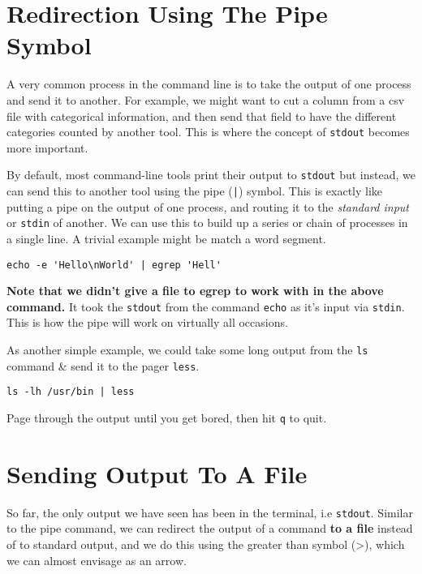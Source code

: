 \section{Redirection Using The Pipe Symbol}
\begin{information}
A very common process in the command line is to take the output of one process and send it to another.
For example, we might want to cut a column from a csv file with categorical information, and then send that field to have the different categories counted by another tool.
This is where the concept of \texttt{stdout} becomes more important. \\
\end{information}

\begin{steps}
By default, most command-line tools print their output to \texttt{stdout} but instead, we can send this to another tool using the pipe (\texttt{|}) symbol.
This is exactly like putting a pipe on the output of one process, and routing it to the \textit{standard input} or \texttt{stdin} of another.
We can use this to build up a series or chain of processes in a single line.
A trivial example might be match a word segment.
\begin{lstlisting}
echo -e 'Hello\nWorld' | egrep 'Hell'
\end{lstlisting}
\end{steps}

\begin{information}
\textbf{Note that we didn't give a file to egrep to work with in the above command.}
It took the \texttt{stdout} from the command \texttt{echo} as it's input via \texttt{stdin}.
This is how the pipe will work on virtually all occasions.
\end{information}

\begin{steps}
As another simple example, we could take some long output from the \texttt{ls} command \& send it to the pager \texttt{less}.
\begin{lstlisting}
ls -lh /usr/bin | less
\end{lstlisting}
Page through the output until you get bored, then hit \texttt{q} to quit.
\end{steps}

\section{Sending Output To A File}
\begin{information}
So far, the only output we have seen has been in the terminal, i.e  \texttt{stdout}.
Similar to the pipe command, we can redirect the output of a command \textbf{to a file} instead of to standard output, and we do this using the greater than symbol (\textgreater), which we can almost envisage as an arrow.\\

\end{information}

